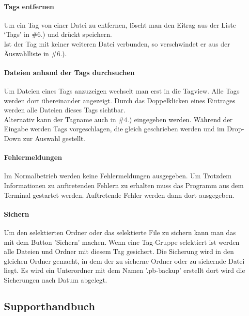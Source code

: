 \documentclass[10pt,paper=a4,final]{scrartcl}
\begin{document}
\paragraph{Tags entfernen}
Um ein Tag von einer Datei zu entfernen, l\"oscht man den Eitrag aus der Liste ‘Tags’ in \#6.) und dr\"uckt speichern.\\
Ist der Tag mit keiner weiteren Datei verbunden, so verschwindet er aus der \"Auswahlliste in \#6.).
\paragraph{Dateien anhand der Tags durchsuchen}
Um Dateien eines Tags anzuzeigen wechselt man erst in die Tagview. Alle Tags werden dort \"ubereinander angezeigt. Durch das Doppelklicken eines Eintrages werden alle Dateien dieses Tags sichtbar.\\
Alternativ kann der Tagname auch in \#4.) eingegeben werden. W\"ahrend der Eingabe werden Tags vorgeschlagen, die gleich geschrieben werden und im Drop-Down zur Auswahl gestellt.
\paragraph{Fehlermeldungen}
Im Normalbetrieb werden keine Fehlermeldungen ausgegeben. Um Trotzdem Informationen zu auftretenden Fehlern zu erhalten muss das Programm aus dem Terminal gestartet werden. Auftretende Fehler werden dann dort ausgegeben.
\paragraph{Sichern}
Um den selektierten Ordner oder das selektierte File zu sichern kann man das mit dem Button 'Sichern' machen. Wenn eine Tag-Gruppe selektiert ist werden alle Dateien und Ordner mit diesem Tag gesichert. Die Sicherung wird in den gleichen Ordner gemacht, in dem der zu sicherne Ordner oder zu sichernde Datei liegt. Es wird ein Unterordner mit dem Namen '.pb-backup' erstellt dort wird die Sicherungen nach Datum abgelegt.
\subsection{Supporthandbuch}
\end{document}
